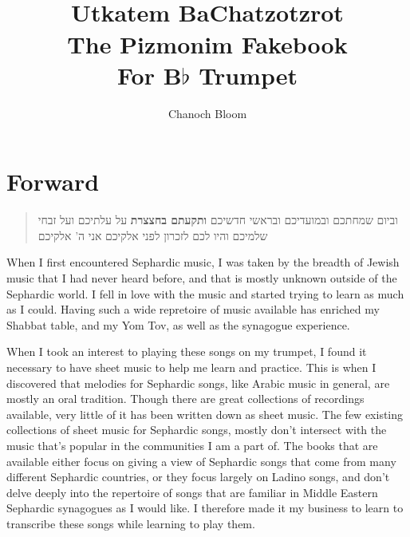 \documentclass[letterpaper]{memoir}
\title{\RL{ותקעתם בחצוצרות} \\
Utkatem BaChatzotzrot \\
The Pizmonim Fakebook \\
For B$\flat$ Trumpet
}
\author{Chanoch Bloom}
\begin{document}
\begin{titlingpage}
\maketitle
\end{titlingpage}

\setlength{\footskip}{72pt}
\pagestyle{plain}
\tableofcontents*

\chapter{Forward}

\begin{RTL}
\begin{quotation}
\begin{center}
וביום שמחתכם ובמועדיכם ובראשי חדשיכם
\textbf{ותקעתם בחצצרת} 
על עלתיכם ועל זבחי שלמיכם והיו לכם לזכרון לפני אלקיכם אני ה' אלקיכם
\end{center}
\end{quotation}
\end{RTL}

When I first encountered Sephardic music, I was taken by the breadth of Jewish 
music that I had never heard before, and that is mostly unknown outside of the 
Sephardic world. I fell in love with the music and started trying to learn as 
much as I could. Having such a wide repretoire of music available has enriched 
my Shabbat table, and my Yom Tov, as well as the synagogue experience.

When I took an interest to playing these songs on my trumpet, I found it 
necessary to have sheet music to help me learn and practice. This is when I 
discovered that melodies for Sephardic songs, like Arabic music in general, are 
mostly an oral tradition. Though there are great collections of recordings available,
very little of it has been written down as sheet music.
The few existing collections of sheet music for 
Sephardic songs, mostly don't intersect with the music that's popular in the 
communities I am a part of. The books that are available either focus on giving 
a view of Sephardic songs that come from many different Sephardic countries, or 
they focus largely on Ladino songs, and don't delve deeply into the repertoire 
of songs that are familiar in Middle Eastern Sephardic synagogues as I would 
like. I therefore made it my business to learn to transcribe these songs while 
learning to play them.
\end{document}
